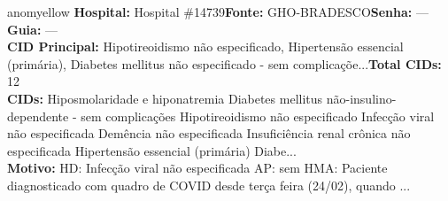 \documentclass[a4paper,10pt]{article}
\begin{document}
\begin{anomalycard}[Interna\c{c}\~{a}o \#118820 | Pac. \#98558 | MODERADO (z=2.25) | LOS: 4d | 26/02/2026\,$\to$\,02/03/2026]{anomyellow}
\textbf{Hospital:} Hospital \#14739\quad \textbf{Fonte:} GHO-BRADESCO\quad \textbf{Senha:} ---\quad \textbf{Guia:} ---\\

\textbf{CID Principal:} {\small Hipotireoidismo não especificado, Hipertensão essencial (primária), Diabetes mellitus não especificado - sem complicaçõe...}\quad\textbf{Total CIDs:} 12\\

\textbf{CIDs:} {\scriptsize Hiposmolaridade e hiponatremia \textbar{} Diabetes mellitus não-insulino-dependente - sem complicações \textbar{} Hipotireoidismo não especificado \textbar{} Infecção viral não especificada \textbar{} Demência não especificada \textbar{} Insuficiência renal crônica não especificada \textbar{} Hipertensão essencial (primária) \textbar{} Diabe...}\\

\textbf{Motivo:} {\scriptsize HD:  Infecção viral não especificada  AP: sem HMA: Paciente diagnosticado com quadro de COVID desde terça feira (24/02), quando ...}\\



\end{anomalycard}
\end{document}
